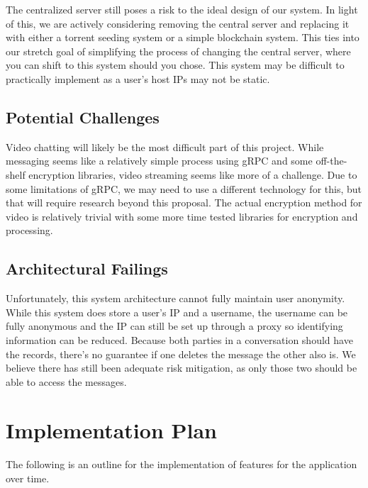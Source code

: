 \documentclass[titlepage]{article}
\begin{document}
      The centralized server still poses a risk to the ideal design of our system. 
      In light of this, we are actively considering removing the central server and replacing it with either a torrent seeding system or a simple blockchain system.
      This ties into our stretch goal of simplifying the process of changing the central server, where you can shift to this system should you chose.
      This system may be difficult to practically implement as a user's host IPs may not be static.

      \subsection{Potential Challenges}

      Video chatting will likely be the most difficult part of this project.
      While messaging seems like a relatively simple process using gRPC and some off-the-shelf encryption libraries, video streaming seems like more of a challenge.
      Due to some limitations of gRPC, we may need to use a different technology for this, but that will require research beyond this proposal.
      The actual encryption method for video is relatively trivial with some more time tested libraries for encryption and processing.

      \subsection{Architectural Failings}

      Unfortunately, this system architecture cannot fully maintain user anonymity.
      While this system does store a user's IP and a username, the username can be fully anonymous and the IP can still be set up through a proxy so identifying information can be reduced.
      Because both parties in a conversation should have the records, there's no guarantee if one deletes the message the other also is.
      We believe there has still been adequate risk mitigation, as only those two should be able to access the messages.

    \section{Implementation Plan}
    
    The following is an outline for the implementation of features for the application over time. \\
\end{document}
